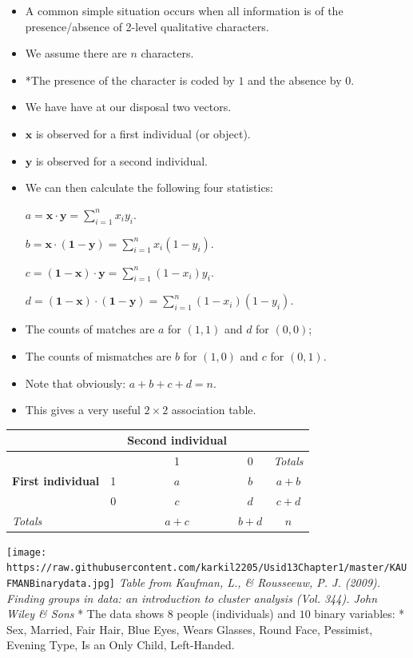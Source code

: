 \documentclass[
]{article}
\begin{document}
\begin{itemize}
\item
  A common simple situation occurs when all information is of the
  presence/absence of 2-level qualitative characters.
\item
  We assume there are \(n\) characters.
\item
  *The presence of the character is coded by \(1\) and the absence by 0.
\item
  We have have at our disposal two vectors.
\item
  \(\mathbf{x}\) is observed for a first individual (or object).
\item
  \(\mathbf{y}\) is observed for a second individual.
\item
  We can then calculate the following four statistics:

  \(a=\mathbf{x\cdot y}=\sum_{i=1}^nx_iy_i.\)

  \(b=\mathbf{x\cdot (1-y)}=\sum_{i=1}^nx_i(1-y_i).\)

  \(c=\mathbf{(1-x)\cdot y}=\sum_{i=1}^n(1-x_i)y_i.\)

  \(d=\mathbf{(1-x)\cdot (1-y)}=\sum_{i=1}^n(1-x_i)(1-y_i).\)
\item
  The counts of matches are \(a\) for \((1,1)\) and \(d\) for \((0,0)\);
\item
  The counts of mismatches are \(b\) for \((1,0)\) and \(c\) for
  \((0,1)\).
\item
  Note that obviously: \(a+b+c+d= n\).
\item
  This gives a very useful \(2 \times 2\) association table.
\end{itemize}

\begin{longtable}[]{@{}llccc@{}}
\toprule
& & Second individual & &\tabularnewline
\midrule
\endhead
& & 1 & 0 & \emph{Totals}\tabularnewline
\textbf{First individual} & 1 & \(a\) & \(b\) & \(a+b\)\tabularnewline
& 0 & \(c\) & \(d\) & \(c+d\)\tabularnewline
\emph{Totals} & & \(a+c\) & \(b+d\) & \(n\)\tabularnewline
\bottomrule
\end{longtable}

\texttt{[image: https://raw.githubusercontent.com/karkil2205/Usid13Chapter1/master/KAUFMANBinarydata.jpg]}
\emph{Table from Kaufman, L., \& Rousseeuw, P. J. (2009). \emph{Finding
groups in data: an introduction to cluster analysis} (Vol. 344). John
Wiley \& Sons} * The data shows \(8\) people (individuals) and \(10\)
binary variables: * Sex, Married, Fair Hair, Blue Eyes, Wears Glasses,
Round Face, Pessimist, Evening Type, Is an Only Child, Left-Handed.
\end{document}
